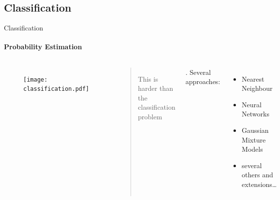 \documentclass[compress]{beamer}
\begin{document}
\subsection{Classification}

\begin{frame}{Classification}
\framesubtitle{Probability Estimation}

\begin{columns}[t]
    \begin{figure}
        \texttt{[image: classification.pdf]}
    \end{figure}
    \begin{quote}This is harder than the classification problem\cite{cortes1995support}\end{quote}.
    Several approaches\cite{bishop2006pattern}:
    \begin{itemize}
        \item Nearest Neighbour
        \item Neural Networks
        \item Gaussian Mixture Models
        \item several others and extensions\dots 
    \end{itemize}
\end{columns}
\end{frame}
\end{document}
